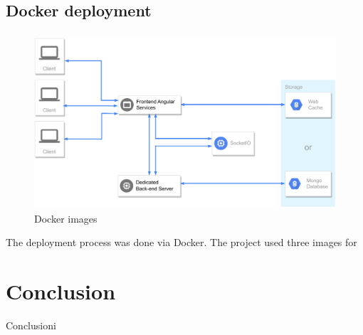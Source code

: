 \documentclass[multi, tikz]{article}
\begin{document}
\subsection{Docker deployment}

\subsubsection{}

\begin{figure}[h!]
  \centering
  \includegraphics[scale=0.70]{diagrams/architecture.drawio.pdf}
  \caption{Docker images}
  \label{fig:deathstar}
\end{figure}


The deployment process was done via Docker. The project used three images for

\section{Conclusion}
Conclusioni



\end{document}
